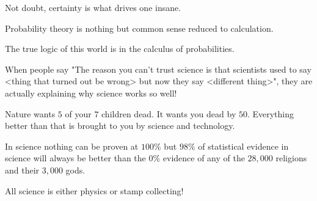  	\begin{fuquote}Not doubt, certainty is what drives one insane.
 	\end{fuquote}
 	
 	\begin{fuquote}Probability theory is nothing but common sense reduced to calculation.
 	\end{fuquote}
 	
 	\begin{fuquote}The true logic of this world is in the calculus of probabilities.
 	\end{fuquote}
 	
 	\begin{fuquote}When people say "The reason you can't trust science is that scientists used to say <thing that turned out be wrong> but now they say <different thing>", they are actually explaining why science works so well!
 	\end{fuquote}
 	
 	\begin{fuquote}Nature wants $5$ of your $7$ children dead. It wants you dead by $50$. Everything better than that is brought to you by science and technology.
 	\end{fuquote}
 	
 	\begin{fuquote}[?]In science nothing can be proven at $100\%$ but $98\%$ of statistical evidence in science will always be better than the $0\%$ evidence of any of the $28,000$ religions and their $3,000$ gods.
 	\end{fuquote}
 	
 	\begin{fuquote}All science is either physics or stamp collecting!
 	\end{fuquote}